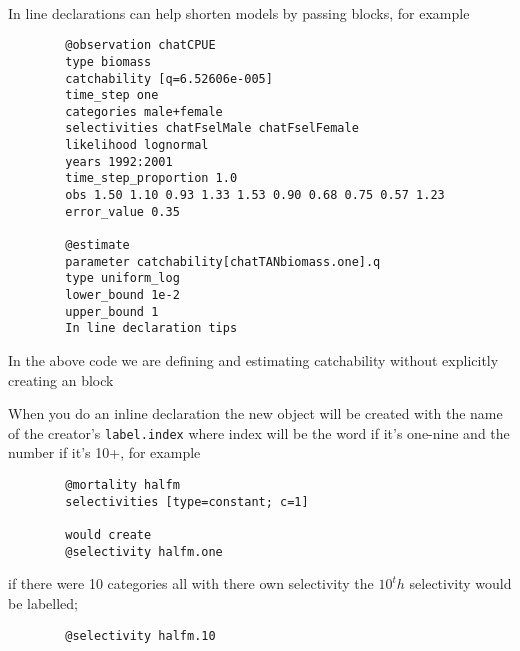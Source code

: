 \paragraph*{\label{sec:declare}}
In line declarations can help shorten models by passing \command{} blocks, for example 
{\small{\begin{verbatim}
		@observation chatCPUE
		type biomass
		catchability [q=6.52606e-005]
		time_step one
		categories male+female
		selectivities chatFselMale chatFselFemale
		likelihood lognormal
		years 1992:2001
		time_step_proportion 1.0
		obs 1.50 1.10 0.93 1.33 1.53 0.90 0.68 0.75 0.57 1.23
		error_value 0.35
		
		@estimate 
		parameter catchability[chatTANbiomass.one].q
		type uniform_log
		lower_bound 1e-2
		upper_bound 1
		In line declaration tips
		\end{verbatim}}}

In the above code we are defining and estimating catchability without explicitly creating an  block


When you do an inline declaration the new object will be created with the name of the creator's \texttt{label.index}
where index will be the word if it's one-nine and the number if it's 10+, for example
{\small{\begin{verbatim}
		@mortality halfm
		selectivities [type=constant; c=1]
		
		would create
		@selectivity halfm.one
		\end{verbatim}}}

if there were 10 categories all with there own selectivity the $10^th$ selectivity would be labelled;

{\small{\begin{verbatim}
		@selectivity halfm.10
		\end{verbatim}}}
